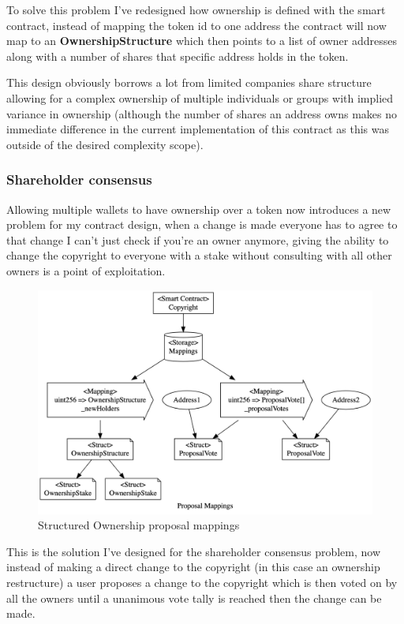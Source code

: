 To solve this problem I've redesigned how ownership is defined with the smart contract, instead of mapping the token id to one address the contract will now map to an \textbf{OwnershipStructure} which then points to a list of owner addresses along with a number of shares that specific address holds in the token.

This design obviously borrows a lot from limited companies share structure allowing for a complex ownership of multiple individuals or groups with implied variance in ownership (although the number of shares an address owns makes no immediate difference in the current implementation of this contract as this was outside of the desired complexity scope).

\subsubsection{Shareholder consensus}

Allowing multiple wallets to have ownership over a token now introduces a new problem for my contract design, when a change is made everyone has to agree to that change I can't just check if you're an owner anymore, giving the ability to change the copyright to everyone with a stake without consulting with all other owners is a point of exploitation.

\begin{figure}[H]
\caption{Structured Ownership proposal mappings}
\centering
\includegraphics[width=\textwidth,height=\textheight,keepaspectratio]{images/operational/prop-mappings.png}
\end{figure}

This is the solution I've designed for the shareholder consensus problem, now instead of making a direct change to the copyright (in this case an ownership restructure) a user proposes a change to the copyright which is then voted on by all the owners until a unanimous vote tally is reached then the change can be made.

